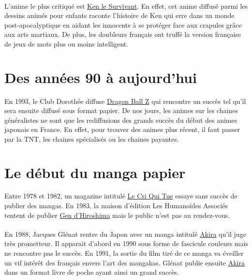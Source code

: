 \paragraph{} L’anime le plus critiqué est \underline{Ken le Survivant}. En
effet, cet anime diffusé parmi les dessins animés pour enfants raconte
l’histoire de Ken qui erre dans un monde post-apocalyptique en aidant les
innocents à se protéger face aux crapules grâce aux arts martiaux. De plus, les
doubleurs français ont truffé la version française de jeux de mots plus ou
moins intelligent.

\section{Des années 90 à aujourd'hui}

\paragraph{} En 1993, le Club Dorothée diffuse \underline{Dragon Ball Z} qui
rencontre un  succès tel qu’il sera ensuite diffusé sous format papier. De nos
jours, les animes sur les chaines généralistes ne sont que les rediffusions des
grands succès du début des animes japonais en France.  En effet, pour trouver
des animes plus récent, il faut passer par la TNT, les chaines spécialisés ou
les chaines payantes. 

\section{Le début du manga papier}

\paragraph{} Entre 1978 et 1982, un magazine intitulé \underline{Le Cri Qui
Tue} essaye sans succès de publier des mangas. En 1983, la maison d’édition Les
Humanoïdes Associés tentent de publier \underline{Gen d’Hiroshima} mais le
public n’est pas au rendez-vous. 

\paragraph{} En 1988, Jacques Glénat rentre du Japon avec un manga intitulé
\underline{Akira} qu’il juge très prometteur. Il apparait d’abord en 1990 sous
forme de fascicule couleurs mais ne rencontre pas le succès. En 1991, la sortie
du film tiré de ce manga va éveiller un vif intérêt des français envers l’art
des mangakas. Glénat publie ensuite \underline{Akira} dans un format livre de
poche ayant ainsi un grand succès. 

